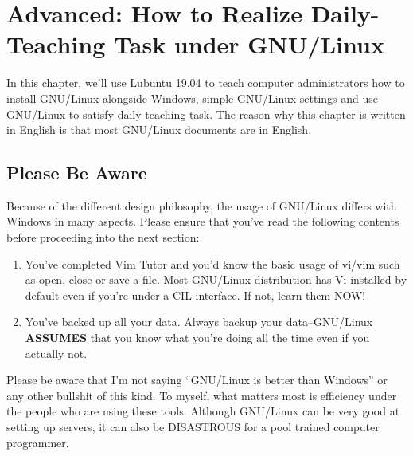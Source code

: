 \chapter{Advanced: How to Realize Daily-Teaching Task under GNU/Linux}
In this chapter, we'll use Lubuntu 19.04 to teach computer administrators how to install GNU/Linux alongside Windows, simple GNU/Linux settings and use GNU/Linux to satisfy daily teaching task. The reason why this chapter is written in English is that most GNU/Linux documents are in English.\par
\section{Please Be Aware}
Because of the different design philosophy, the usage of GNU/Linux differs with Windows in many aspects. Please ensure that you've read the following contents before proceeding into the next section:
\begin{enumerate}
    \item You've completed Vim Tutor and you'd know the basic usage of vi/vim such as open, close or save a file. Most GNU/Linux distribution has Vi installed by default even if you're under a CIL interface. If not, learn them NOW!
    \item You've backed up all your data. Always backup your data--GNU/Linux \textbf{ASSUMES} that you know what you're doing all the time even if you actually not.
\end{enumerate}
Please be aware that I'm not saying ``GNU/Linux is better than Windows'' or any other bullshit of this kind. To myself, what matters most is efficiency under the people who are using these tools. Although GNU/Linux can be very good at setting up servers, it can also be DISASTROUS for a pool trained computer programmer.
